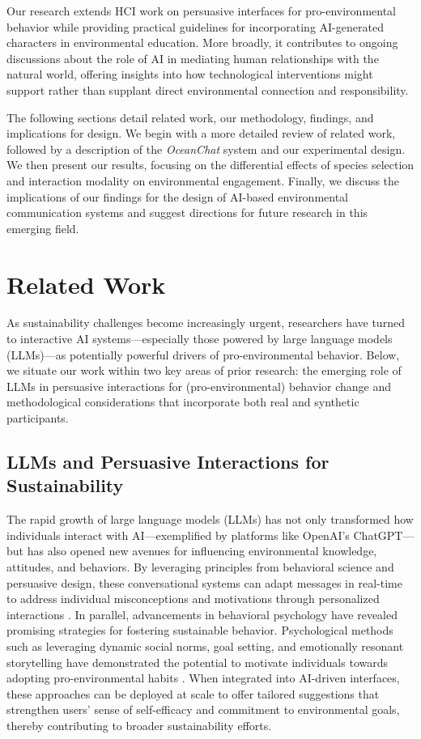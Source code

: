 \documentclass[sigconf, nonacm]{acmart}
\begin{document}
Our research extends HCI work on persuasive interfaces for pro-environmental behavior while providing practical guidelines for incorporating AI-generated characters in environmental education. More broadly, it contributes to ongoing discussions about the role of AI in mediating human relationships with the natural world, offering insights into how technological interventions might support rather than supplant direct environmental connection and responsibility.

The following sections detail related work, our methodology, findings, and implications for design. We begin with a more detailed review of related work, followed by a description of the \textit{OceanChat} system and our experimental design. We then present our results, focusing on the differential effects of species selection and interaction modality on environmental engagement. Finally, we discuss the implications of our findings for the design of AI-based environmental communication systems and suggest directions for future research in this emerging field.

\section{Related Work}
As sustainability challenges become increasingly urgent, researchers have turned to interactive AI systems—especially those powered by large language models (LLMs)—as potentially powerful drivers of pro-environmental behavior. Below, we situate our work within two key areas of prior research: the emerging role of LLMs in persuasive interactions for (pro-environmental) behavior change and methodological considerations that incorporate both real and synthetic participants.

\subsection{LLMs and Persuasive Interactions for Sustainability}
The rapid growth of large language models (LLMs) has not only transformed how individuals interact with AI—exemplified by platforms like OpenAI’s ChatGPT—but has also opened new avenues for influencing environmental knowledge, attitudes, and behaviors. By leveraging principles from behavioral science and persuasive design, these conversational systems can adapt messages in real-time to address individual misconceptions and motivations through personalized interactions \cite{Fogg2003, Giudici2024, Giudici2024b}. In parallel, advancements in behavioral psychology have revealed promising strategies for fostering sustainable behavior. Psychological methods such as leveraging dynamic social norms, goal setting, and emotionally resonant storytelling have demonstrated the potential to motivate individuals towards adopting pro-environmental habits \cite{Breiter2024, Vlasceanu2024, Gifford2011a, Aavik2022UsingChoices}. When integrated into AI-driven interfaces, these approaches can be deployed at scale to offer tailored suggestions that strengthen users’ sense of self-efficacy and commitment to environmental goals, thereby contributing to broader sustainability efforts.
\end{document}
